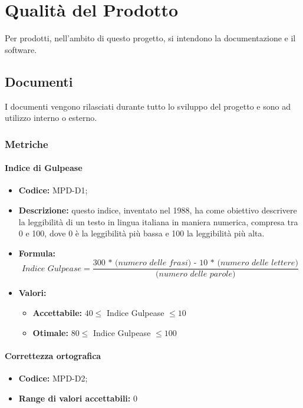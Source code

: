 \section{Qualità del Prodotto}
Per prodotti, nell'ambito di questo progetto, si intendono la documentazione e il software.

\subsection{Documenti}
I documenti vengono rilasciati durante tutto lo sviluppo del progetto e sono ad utilizzo interno o esterno.

\subsubsection{Metriche}

 
    \paragraph{Indice di Gulpease}
\begin{itemize}
\item \textbf{Codice:} MPD-D1;
\item \textbf{Descrizione:} questo indice, inventato nel 1988, ha come obiettivo descrivere la leggibilità di un testo in lingua italiana in maniera numerica, compresa tra 0 e 100, dove 0 è la leggibilità più bassa e 100 la leggibilità più alta. 
\item \textbf{Formula:} \[\textit{Indice Gulpease} = \frac{\textit{300 * (numero delle frasi) - 10 * (numero delle lettere)}}{\textit{(numero delle parole)}}\]
\item \textbf{Valori:}
    \begin{itemize}
        \item \textbf{Accettabile:} $40 \leq$ Indice Gulpease $\leq 10$
        \item \textbf{Otimale:} $80 \leq$ Indice Gulpease $\leq 100$
    \end{itemize}

   
\end{itemize}

\paragraph{Correttezza ortografica}
\begin{itemize}
    \item \textbf{Codice:} MPD-D2;
    \item  \textbf{Range di valori accettabili:} 0
\end{itemize}

